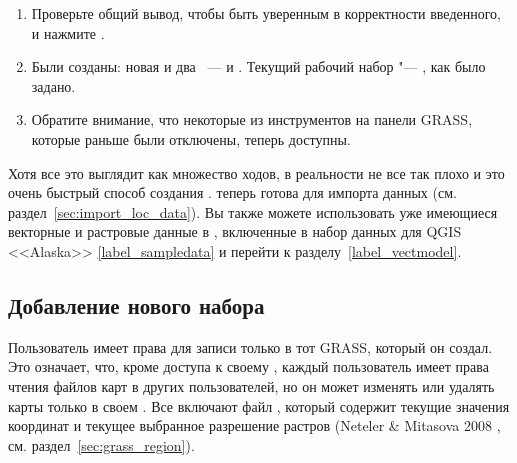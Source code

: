 \begin{enumerate}
  новой . Вы можете называть его как угодно "--- мы
  используем имя <<demo>>.
  \footnote{Когда создается новая , GRASS автоматически
  создает специальный , называемый ,
  спроектированный для хранения главных данных проекта, его исходного
  пространственного охвата и определений системы координат
  (Neteler \& Mitasova 2008 \cite{neteler_mitasova08}).}
  \item Проверьте общий вывод, чтобы быть уверенным в корректности
  введенного, и нажмите .
\item Были созданы: новая   и два ~---
     и . Текущий
  рабочий набор "--- , как было задано.
  \item Обратите внимание, что некоторые из инструментов на панели
  GRASS, которые раньше были отключены, теперь доступны.
\end{enumerate}

Хотя все это выглядит как множество ходов, в реальности не все так плохо
и это очень быстрый способ создания .
 теперь готова для импорта данных (см.
раздел~\ref{sec:import_loc_data}). Вы также можете использовать уже
имеющиеся векторные и растровые данные в ,
включенные в набор данных для QGIS <<Alaska>> \ref{label_sampledata} и
перейти к разделу~\ref{label_vectmodel}.

\subsection{Добавление нового набора}\label{sec:add_mapset}

Пользователь имеет права для записи только в тот 
GRASS, который он создал. Это означает, что, кроме доступа к своему
, каждый пользователь имеет права чтения файлов карт в
 других пользователей, но он может изменять или
удалять карты только в своем . Все 
включают файл , который содержит текущие значения
координат и текущее выбранное разрешение растров (Neteler \& Mitasova 2008
\cite{neteler_mitasova08}, см. раздел~\ref{sec:grass_region}).

